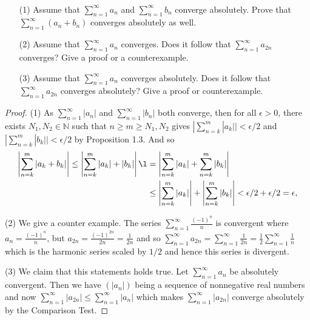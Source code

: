 \documentclass[oneside]{amsart}
\theoremstyle{definition}
\newcommand{\nn}{\mathbb N}
\begin{document}
\begin{tcolorbox}[colback=black!5!white,colframe=black!75!black,title= Exercise $3.2.$] 
\
\begin{itemize}
	\item [(1)] Assume that $ \sum_{n=1}^\infty a_n$ and $ \sum_{n=1}^\infty b_n$ converge absolutely. Prove that $  \sum_{n=1}^\infty (a_n+b_n)$ converges absolutely as well.
	\item [(2)] Assume that $ \sum_{n=1}^\infty a_n$ converges. Does it follow that $ \sum_{n=1}^\infty a_{2n}$ converges? Give a proof or a counterexample. 
	\item [(3)] Assume that $ \sum_{n=1}^\infty a_n$ converges absolutely. Does it follow that $ \sum_{n=1}^\infty a_{2n}$ converges absolutely? Give a proof or counterexample. 
\end{itemize}
\tcblower 
\begin{proof} (1) As $ \sum_{n=1}^\infty |a_n|$ and $\sum_{n=1}^\infty |b_n|$ both converge, then for all $\epsilon > 0$, there exists $N_1, N_2 \in \nn$ such that $n \geq m \geq N_1,N_2$ gives $ |\sum_{n=k}^m  |a_k|| < \epsilon /2 $ and  $ |\sum_{n=k}^m  |b_k|| < \epsilon /2 $ by Proposition 1.3. And so 
\begin{align*}
	\left| \sum_{n=k}^m |a_k + b_k| \right | \leq \left | \sum _{n=k}^m |a_k| + |b_k| \right | \l & = \left | \sum _{n=k}^m |a_k| + \sum _{n=k}^m |b_k| \right | \\ 
	&\leq \left | \sum _{n=k}^m |a_k|\right | + \left | \sum _{n=k}^m |b_k|\right | < \epsilon/2+\epsilon/2 = \epsilon, 
\end{align*}

(2) We give a counter example. The series $ \sum_{n=1}^\infty \frac{(-1)^n}{n}$ is convergent where $a_n = \frac{(-1)^n}{n}$, but $a_{2n} = \frac{(-1)^{2n}}{2n} = \frac{1}{2n}$ and so $\sum_{n=1}^\infty a_{2n} = \sum_{n=1}^\infty \frac{1}{2n} = \frac{1}{2} \sum_{n=1}^\infty \frac{1}{n}$ which is the harmonic series scaled by $1/2$ and hence this series is divergent. 

(3) We claim that this statements holds true. Let $\sum_{n=1}^\infty a_n$ be absolutely convergent. Then we have $(|a_n|)$ being a sequence of nonnegative real numbers and now $\sum_{n=1}^\infty |a_{2n}| \leq \sum_{n=1}^\infty |a_n|$ which makes $\sum_{n=1}^\infty |a_{2n}|$ converge absolutely by the Comparison Test.


\end{proof}

\end{tcolorbox}
\end{document}
